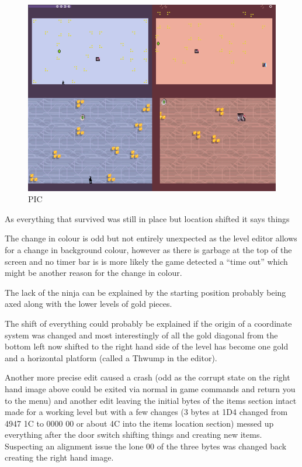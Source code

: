 \documentclass[
]{book}
\begin{document}
\begin{figure}
\centering
\includegraphics{images/176_home_fast6191_romhackingguide_unrenamed_fil___ers_romhackingguideleveleditingworkedNplus9.png}
\caption{PIC}
\end{figure}

As everything that survived was still in place but location shifted it says things

The change in colour is odd but not entirely unexpected as the level editor allows for a change in background colour, however as there is garbage at the top of the screen and no timer bar is is more likely the game detected a ``time out'' which might be another reason for the change in colour.

The lack of the ninja can be explained by the starting position probably being axed along with the lower levels of gold pieces.

The shift of everything could probably be explained if the origin of a coordinate system was changed and most interestingly of all the gold diagonal from the bottom left now shifted to the right hand side of the level has become one gold and a horizontal platform (called a Thwump in the editor).

Another more precise edit caused a crash (odd as the corrupt state on the right hand image above could be exited via normal in game commands and return you to the menu) and another edit leaving the initial bytes of the items section intact made for a working level but with a few changes (3 bytes at 1D4 changed from 4947 1C to 0000 00 or about 4C into the items location section) messed up everything after the door switch shifting things and creating new items. Suspecting an alignment issue the lone 00 of the three bytes was changed back creating the right hand image.
\end{document}
